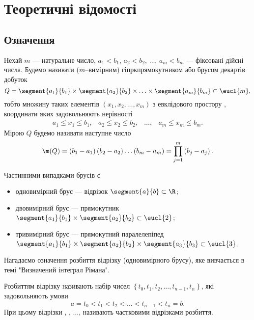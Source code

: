 \chapter{Теоретичні відомості}
\section{Означення}
\begin{definition}[Гіперпрямокутник]\label{def:box}
Нехай $m$ --- натуральне число, ${a_1<b_1}$, ${a_2 < b_2}$, $\ldots$, ${a_m < b_m}$ --- фіксовані дійсні числа. Будемо називати ($m$--вимірним) гіпркпрямокутником або брусом декартів добуток
\[
Q = \segment{a_1}{b_1}\times\segment{a_2}{b_2}\times\ldots\times\segment{a_m}{b_m} \subset \eucl{m},
\]
тобто множину таких елементів ${\left(x_1, x_2, \ldots, x_m\right)}$ з евклідового простору , координати яких задовольняють нерівності
\[
\begin{array}{cccc}
a_1\leq x_1\leq b_1,&
a_2\leq x_2\leq b_2,&
\ldots,&
a_m\leq x_m\leq b_m.
\end{array}
\]
Мірою $Q$ будемо називати наступне число
\[
\m(Q) = \left(b_1-a_1\right)\left(b_2 - a_2\right)\ldots\left(b_m-a_m\right) = \prod\limits_{j=1}^{m}\left(b_j - a_j\right).
\]
\end{definition}
\begin{example}
Частинними випадками брусів є
\begin{itemize}
\item одновимірний брус --- відрізок ${\segment{a}{b}\subset\R}$;
\item двовимірний брус --- прямокутник ${\segment{a_1}{b_1}\times\segment{a_2}{b_2}\subset\eucl{2}}$;
\item тривимірний брус --- прямокутний паралелепіпед  ${\segment{a_1}{b_1}\times\segment{a_2}{b_2}\times\segment{a_3}{b_3}\subset\eucl{3}}$.
\end{itemize}
\end{example}
Нагадаємо означення розбиття відрізку (одновимірного брусу), яке вивчається в темі "Визначений інтеграл Рімана".
\begin{definition}
Розбиттям відрізку  називають набір чисел ${\left\{t_0, t_1, t_2, \ldots, t_{n-1}, t_{n}\right\}}$, які задовольняють умови
\[
a = t_0 < t_1 < t_2 < \ldots  < t_{n-1} < t_{n} = b.
\]
При цьому відрізки , , ${\ldots}$,  називають частковими відрізками розбиття.

\end{definition}

